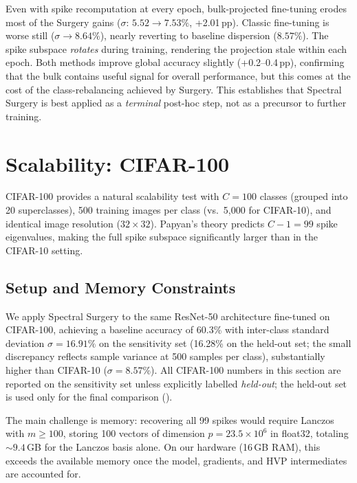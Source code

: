 \documentclass[11pt,a4paper]{article}
\begin{document}
Even with spike recomputation at every epoch, bulk-projected
fine-tuning erodes most of the Surgery gains ($\sigma$: $5.52 \to
7.53\%$, +2.01\,pp). Classic fine-tuning is worse still
($\sigma \to 8.64\%$), nearly reverting to baseline dispersion
($8.57\%$). The spike subspace \emph{rotates} during training,
rendering the projection stale within each epoch. Both methods improve
global accuracy slightly (+0.2--0.4\,pp), confirming that the bulk
contains useful signal for overall performance, but this comes at the
cost of the class-rebalancing achieved by Surgery.
This establishes that Spectral Surgery is best applied as a
\emph{terminal} post-hoc step, not as a precursor to further training.

\section{Scalability: CIFAR-100}
\label{sec:cifar100}

CIFAR-100 provides a natural scalability test with $C = 100$ classes
(grouped into 20 superclasses), 500 training images per class (vs.\
5,000 for CIFAR-10), and identical image resolution ($32 \times 32$).
Papyan's theory predicts $C{-}1 = 99$ spike eigenvalues, making the
full spike subspace significantly larger than in the CIFAR-10 setting.

\subsection{Setup and Memory Constraints}

We apply Spectral Surgery to the same ResNet-50 architecture fine-tuned
on CIFAR-100, achieving a baseline accuracy of 60.3\% with inter-class
standard deviation $\sigma = 16.91\%$ on the sensitivity set (16.28\%
on the held-out set; the small discrepancy reflects sample variance at
500 samples per class), substantially higher than CIFAR-10
($\sigma = 8.57\%$). All CIFAR-100 numbers in this section are reported
on the sensitivity set unless explicitly labelled \emph{held-out}; the
held-out set is used only for the final comparison
().

The main challenge is memory: recovering all 99 spikes would require
Lanczos with $m \geq 100$, storing 100 vectors of dimension
$p = 23.5 \times 10^6$ in float32, totaling ${\sim}9.4$\,GB for the
Lanczos basis alone. On our hardware (16\,GB RAM), this exceeds the
available memory once the model, gradients, and HVP intermediates are
accounted for.
\end{document}
